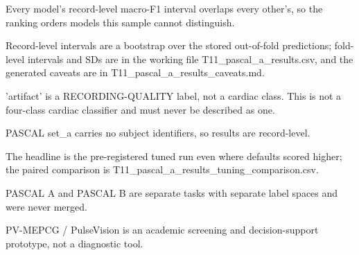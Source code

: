 \begin{table}[htbp]
  \par\footnotesize Every model's record-level macro-F1 interval overlaps every other's, so the ranking orders models this sample cannot distinguish.
  \par\footnotesize Record-level intervals are a bootstrap over the stored out-of-fold predictions; fold-level intervals and SDs are in the working file T11\_pascal\_a\_results.csv, and the generated caveats are in T11\_pascal\_a\_results\_caveats.md.
  \par\footnotesize 'artifact' is a RECORDING-QUALITY label, not a cardiac class. This is not a four-class cardiac classifier and must never be described as one.
  \par\footnotesize PASCAL set\_a carries no subject identifiers, so results are record-level.
  \par\footnotesize The headline is the pre-registered tuned run even where defaults scored higher; the paired comparison is T11\_pascal\_a\_results\_tuning\_comparison.csv.
  \par\footnotesize PASCAL A and PASCAL B are separate tasks with separate label spaces and were never merged.
  \par\footnotesize PV-MEPCG / PulseVision is an academic screening and decision-support prototype, not a diagnostic tool.
\end{table}
